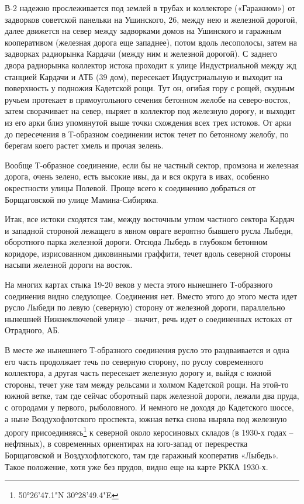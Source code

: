 В-2 надежно прослеживается под землей в трубах и коллекторе («Гаражном») от задворков советской панельки на Ушинского, 26, между нею и железной дорогой, далее движется на север между задворками домов на Ушинского и гаражным кооперативом (железная дорога еще западнее), потом вдоль лесополосы, затем на задворках радиорынка Кардачи (между ним и железной дорогой). С заднего двора радиорынка коллектор истока проходит к улице Индустриальной между жд станцией Кардачи и АТБ (39 дом), пересекает Индустриальную и выходит на поверхность у подножия Кадетской рощи. Тут он, огибая гору с рощей, скудным ручьем протекает в прямоугольного сечения бетонном желобе на северо-восток, затем сворачивает на север, ныряет в коллектор под железную дорогу, и выходит из его арки близ упомянутой выше точки схождения всех трех истоков. От арки до пересечения в Т-образном соединении исток течет по бетонному желобу, по берегам коего растет хмель и прочая зелень.

Вообще Т-образное соединение, если бы не частный сектор, промзона и железная дорога, очень зелено, есть высокие ивы, да и вся округа в ивах, особенно окрестности улицы Полевой. Проще всего к соединению добраться от Борщаговской по улице Мамина-Сибиряка.

Итак, все истоки сходятся там, между восточным углом частного сектора Кардач и западной стороной лежащего в явном овраге вероятно бывшего русла Лыбеди, оборотного парка железной дороги. Отсюда Лыбедь в глубоком бетонном коридоре, изрисованном диковинными граффити, течет вдоль северной стороны насыпи  железной дороги на восток.

На многих картах стыка 19-20 веков у места этого нынешнего Т-образного соединения видно следующее. Соединения нет. Вместо этого до этого места идет русло Лыбеди по левую (северную) сторону от железной дороги, параллельно нынешней Нижнеключевой улице – значит, речь идет о соединенных истоках от Отрадного, АБ.

В месте же нынешнего Т-образного соединения русло это раздваивается и одна его часть продолжает течь по северную сторону, по руслу современного коллектора, а другая часть пересекает железную дорогу и, выйдя с южной стороны, течет уже там между рельсами и холмом Кадетской рощи. На этой-то южной ветке, там где сейчас оборотный парк железной дороги, лежали два пруда, с огородами у первого, рыболовного. И немного не доходя до Кадетского шоссе, а ныне Воздухофлотского проспекта, южная ветка снова ныряла под железную дорогу присоединяясь\footnote{50°26'47.1"N 30°28'49.4"E} к северной около керосиновых складов (в 1930-х годах – нефтяных), в современных ориентирах на юго-запад от перекрестка Борщаговской и Воздухофлотского, там где гаражный кооператив «Лыбедь». Такое положение, хотя уже без прудов, видно еще на карте РККА 1930-х.

